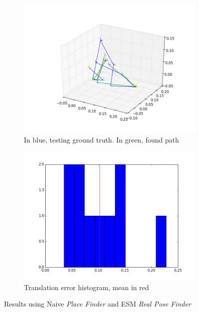 \begin{figure}[htpb]
  \begin{subfigure}[b]{6cm}
          \includegraphics[width=\linewidth]{img/desktop_2_naive_esm_path_1.png}
          \caption{In blue, testing ground truth. In green, found path}                
          \label{fig:desktop_2_naive_esm_path_1}
  \end{subfigure}   
  \qquad
  \begin{subfigure}[b]{6cm}
          \includegraphics[width=\linewidth]{img/desktop_2_naive_esm_dist_1.png}
          \caption{Translation error histogram, mean in red} 
          \label{fig:desktop_2_naive_esm_dist_1}
  \end{subfigure}
  \caption{Results using Naive \textit{Place Finder} and ESM  \textit{Real Pose Finder}}
\end{figure}



